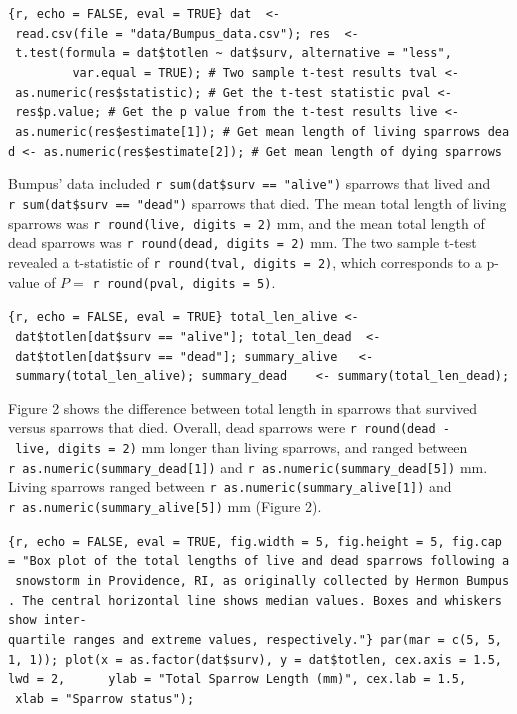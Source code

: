\documentclass[
]{article}
\begin{document}
\texttt{\{r,\ echo\ =\ FALSE,\ eval\ =\ TRUE\}\ dat\ \ \textless{}-\ read.csv(file\ =\ "data/Bumpus\_data.csv");\ res\ \ \textless{}-\ t.test(formula\ =\ dat\$totlen\ \textasciitilde{}\ dat\$surv,\ alternative\ =\ "less",\ \ \ \ \ \ \ \ \ \ \ \ \ \ \ \ \ var.equal\ =\ TRUE);\ \#\ Two\ sample\ t-test\ results\ tval\ \textless{}-\ as.numeric(res\$statistic);\ \#\ Get\ the\ t-test\ statistic\ pval\ \textless{}-\ res\$p.value;\ \#\ Get\ the\ p\ value\ from\ the\ t-test\ results\ live\ \textless{}-\ as.numeric(res\$estimate{[}1{]});\ \#\ Get\ mean\ length\ of\ living\ sparrows\ dead\ \textless{}-\ as.numeric(res\$estimate{[}2{]});\ \#\ Get\ mean\ length\ of\ dying\ sparrows}

Bumpus' data included \texttt{r\ sum(dat\$surv\ ==\ "alive")} sparrows
that lived and \texttt{r\ sum(dat\$surv\ ==\ "dead")} sparrows that
died. The mean total length of living sparrows was
\texttt{r\ round(live,\ digits\ =\ 2)} mm, and the mean total length of
dead sparrows was \texttt{r\ round(dead,\ digits\ =\ 2)} mm. The two
sample t-test revealed a t-statistic of
\texttt{r\ round(tval,\ digits\ =\ 2)}, which corresponds to a p-value
of \(P =\) \texttt{r\ round(pval,\ digits\ =\ 5)}.

\texttt{\{r,\ echo\ =\ FALSE,\ eval\ =\ TRUE\}\ total\_len\_alive\ \textless{}-\ dat\$totlen{[}dat\$surv\ ==\ "alive"{]};\ total\_len\_dead\ \ \textless{}-\ dat\$totlen{[}dat\$surv\ ==\ "dead"{]};\ summary\_alive\ \ \ \textless{}-\ summary(total\_len\_alive);\ summary\_dead\ \ \ \ \textless{}-\ summary(total\_len\_dead);}

Figure 2 shows the difference between total length in sparrows that
survived versus sparrows that died. Overall, dead sparrows were
\texttt{r\ round(dead\ -\ live,\ digits\ =\ 2)} mm longer than living
sparrows, and ranged between
\texttt{r\ as.numeric(summary\_dead{[}1{]})} and
\texttt{r\ as.numeric(summary\_dead{[}5{]})} mm. Living sparrows ranged
between \texttt{r\ as.numeric(summary\_alive{[}1{]})} and
\texttt{r\ as.numeric(summary\_alive{[}5{]})} mm (Figure 2).

\texttt{\{r,\ echo\ =\ FALSE,\ eval\ =\ TRUE,\ fig.width\ =\ 5,\ fig.height\ =\ 5,\ fig.cap\ =\ "Box\ plot\ of\ the\ total\ lengths\ of\ live\ and\ dead\ sparrows\ following\ a\ snowstorm\ in\ Providence,\ RI,\ as\ originally\ collected\ by\ Hermon\ Bumpus.\ The\ central\ horizontal\ line\ shows\ median\ values.\ Boxes\ and\ whiskers\ show\ inter-quartile\ ranges\ and\ extreme\ values,\ respectively."\}\ par(mar\ =\ c(5,\ 5,\ 1,\ 1));\ plot(x\ =\ as.factor(dat\$surv),\ y\ =\ dat\$totlen,\ cex.axis\ =\ 1.5,\ lwd\ =\ 2,\ \ \ \ \ \ ylab\ =\ "Total\ Sparrow\ Length\ (mm)",\ cex.lab\ =\ 1.5,\ \ \ \ \ \ \ xlab\ =\ "Sparrow\ status");}
\end{document}
